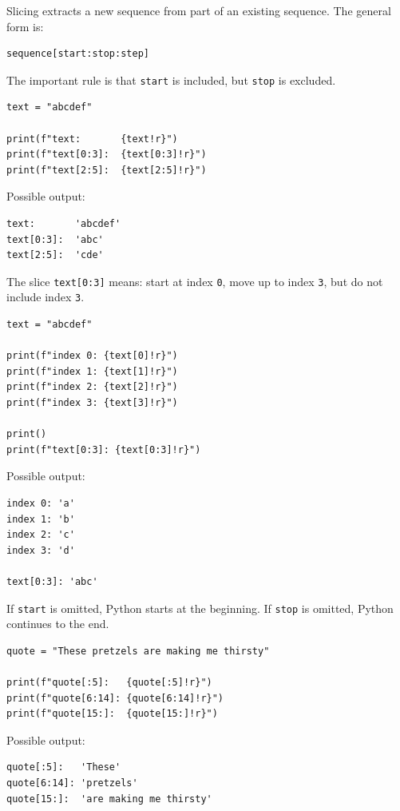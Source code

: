 Slicing extracts a new sequence from part of an existing sequence. The general form is:

\begin{verbatim}
sequence[start:stop:step]
\end{verbatim}

The important rule is that \texttt{start} is included, but \texttt{stop} is excluded.

\begin{verbatim}
text = "abcdef"

print(f"text:       {text!r}")
print(f"text[0:3]:  {text[0:3]!r}")
print(f"text[2:5]:  {text[2:5]!r}")
\end{verbatim}

Possible output:

\begin{verbatim}
text:       'abcdef'
text[0:3]:  'abc'
text[2:5]:  'cde'
\end{verbatim}

The slice \texttt{text[0:3]} means: start at index \texttt{0}, move up to index \texttt{3}, but do not include index \texttt{3}.

\begin{verbatim}
text = "abcdef"

print(f"index 0: {text[0]!r}")
print(f"index 1: {text[1]!r}")
print(f"index 2: {text[2]!r}")
print(f"index 3: {text[3]!r}")

print()
print(f"text[0:3]: {text[0:3]!r}")
\end{verbatim}

Possible output:

\begin{verbatim}
index 0: 'a'
index 1: 'b'
index 2: 'c'
index 3: 'd'

text[0:3]: 'abc'
\end{verbatim}

If \texttt{start} is omitted, Python starts at the beginning. If \texttt{stop} is omitted, Python continues to the end.

\begin{verbatim}
quote = "These pretzels are making me thirsty"

print(f"quote[:5]:   {quote[:5]!r}")
print(f"quote[6:14]: {quote[6:14]!r}")
print(f"quote[15:]:  {quote[15:]!r}")
\end{verbatim}

Possible output:

\begin{verbatim}
quote[:5]:   'These'
quote[6:14]: 'pretzels'
quote[15:]:  'are making me thirsty'
\end{verbatim}

